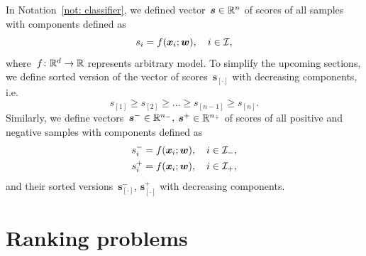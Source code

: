 \begin{notation}\label{not: scores}
  In Notation~\ref{not: classifier}, we defined vector~$\bm{s} \in \mathbb{R}^n$ of scores of all samples with components defined as
  \begin{equation*}
    s_i = f(\bm{x}_i; \bm{w}), \quad i \in \mathcal{I},
  \end{equation*}
  where~$f \colon \mathbb{R}^d \to \mathbb{R}$ represents arbitrary model. To simplify the upcoming sections, we define sorted version of the vector of scores~$\bm{s}_{[\cdot]}$ with decreasing components, i.e.
  \begin{equation*}
    s_{[1]}   \ge s_{[2]} \ge \dots \ge s_{[n - 1]} \ge s_{[n]}.
  \end{equation*}
  Similarly, we define vectors~$\bm{s}^- \in \mathbb{R}^{n_{-}},$ $\bm{s}^+ \in \mathbb{R}^{n_{+}}$ of scores of all positive and negative samples with components defined as
  \begin{equation*}
    \begin{aligned}
      s^-_i & = f(\bm{x}_i; \bm{w}), \quad i \in \mathcal{I}_{-}, \\
      s^+_i & = f(\bm{x}_i; \bm{w}), \quad i \in \mathcal{I}_{+},
    \end{aligned}
  \end{equation*}
  and their sorted versions~$\bm{s}^-_{[\cdot]}$, $\bm{s}^+_{[\cdot]}$ with decreasing components.
\end{notation}

\section{Ranking problems}\label{sec: ranking}


